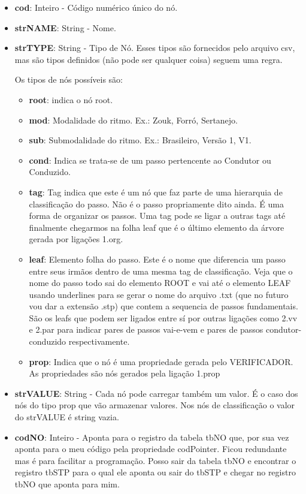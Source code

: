\begin{itemize}
	\item \textbf{cod}: Inteiro - Código numérico único do nó.
	\item \textbf{strNAME}: String - Nome.
	\item \textbf{strTYPE}: String - Tipo de Nó. Esses tipos são fornecidos pelo arquivo csv, mas são tipos definidos (não pode ser qualquer coisa) seguem uma regra.
	
	Os tipos de nós possíveis são:
	
	\begin{itemize}
		\item \textbf{root}: indica o nó root.
		\item \textbf{mod}: Modalidade do ritmo. Ex.: Zouk, Forró, Sertanejo.
		\item \textbf{sub}: Submodalidade do ritmo. Ex.: Brasileiro, Versão 1, V1.
		\item \textbf{cond}: Indica se trata-se de um passo pertencente ao Condutor ou Conduzido.
		\item \textbf{tag}: Tag indica que este é um nó que faz parte de uma hierarquia de classificação do passo. Não é o passo propriamente dito ainda. É uma forma de organizar os passos. Uma tag pode se ligar a outras tags até finalmente chegarmos na folha leaf que é o último elemento da árvore gerada por ligações 1.org. 
		\item \textbf{leaf}: Elemento folha do passo. Este é o nome que diferencia um passo entre seus irmãos dentro de uma mesma tag de classificação. Veja que o nome do passo todo sai do elemento ROOT e vai até o elemento LEAF usando underlines para se gerar o nome do arquivo .txt (que no futuro vou dar a extensão .stp) que contem a sequencia de passos fundamentais. São os leafs que podem ser ligados entre sí por outras ligações como 2.vv e 2.par para indicar pares de passos vai-e-vem e pares de passos condutor-conduzido respectivamente.
		\item \textbf{prop}: Indica que o nó é uma propriedade gerada pelo VERIFICADOR. As propriedades são nós gerados pela ligação 1.prop
	\end{itemize}


\item \textbf{strVALUE}: String - Cada  nó pode carregar também um valor. É o caso dos nós do tipo prop que vão armazenar valores. Nos nós de classificação o valor do strVALUE é string vazia.

\item \textbf{codNO}: Inteiro - Aponta para o registro da tabela tbNO que, por sua vez aponta para o meu código pela propriedade codPointer. Ficou redundante mas é para facilitar a programação. Posso sair da tabela tbNO e encontrar o registro tbSTP para o qual ele aponta ou sair do tbSTP e chegar no registro tbNO que aponta para mim.

	
\end{itemize}

